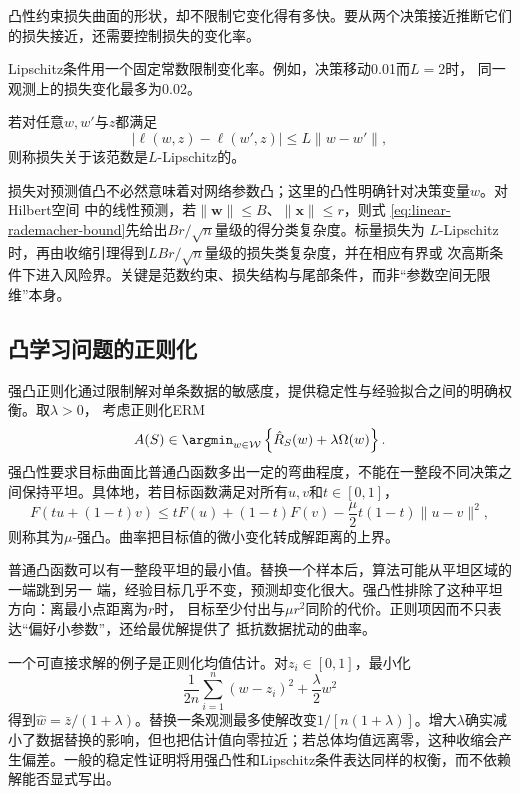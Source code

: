凸性约束损失曲面的形状，却不限制它变化得有多快。要从两个决策接近推断它们的损失接近，还需要控制损失的变化率。

Lipschitz条件用一个固定常数限制变化率。例如，决策移动0.01而$L=2$时，
同一观测上的损失变化最多为0.02。

\begin{definition}[Lipschitz损失]
\label{def:lipschitz-loss}
若对任意$w,w'$与$z$都满足
\begin{equation}
 |\ell(w,z)-\ell(w',z)|\leq L\|w-w'\|,
 \label{eq:lipschitz-loss}
\end{equation}
则称损失关于该范数是$L$-Lipschitz的。
\end{definition}

损失对预测值凸不必然意味着对网络参数凸；这里的凸性明确针对决策变量$w$。对Hilbert空间
中的线性预测，若$\|\bm w\|\leq B$、$\|\bm x\|\leq r$，则式
\eqref{eq:linear-rademacher-bound}先给出$Br/\sqrt n$量级的得分类复杂度。标量损失为
$L$-Lipschitz时，再由收缩引理得到$LBr/\sqrt n$量级的损失类复杂度，并在相应有界或
次高斯条件下进入风险界。关键是范数约束、损失结构与尾部条件，而非“参数空间无限维”本身。

\subsection{凸学习问题的正则化}

强凸正则化通过限制解对单条数据的敏感度，提供稳定性与经验拟合之间的明确权衡。取$\lambda>0$，
考虑正则化ERM
\begin{equation}
 A(S)\in\argmin_{w\in\mathcal W}
 \left\{\hat R_S(w)+\lambda\Omega(w)\right\}.
 \label{eq:regularized-erm}
\end{equation}
强凸性要求目标曲面比普通凸函数多出一定的弯曲程度，不能在一整段不同决策之间保持平坦。具体地，若目标函数满足对所有$u,v$和$t\in[0,1]$，
\begin{equation}
 F(tu+(1-t)v)\leq tF(u)+(1-t)F(v)
 -\frac\mu2t(1-t)\|u-v\|^2,
 \label{eq:strong-convexity}
\end{equation}
则称其为$\mu$-强凸。曲率把目标值的微小变化转成解距离的上界。

普通凸函数可以有一整段平坦的最小值。替换一个样本后，算法可能从平坦区域的一端跳到另一
端，经验目标几乎不变，预测却变化很大。强凸性排除了这种平坦方向：离最小点距离为$r$时，
目标至少付出与$\mu r^2$同阶的代价。正则项因而不只表达“偏好小参数”，还给最优解提供了
抵抗数据扰动的曲率。

一个可直接求解的例子是正则化均值估计。对$z_i\in[0,1]$，最小化
\[
 \frac1{2n}\sum_{i=1}^n(w-z_i)^2+\frac\lambda2w^2
\]
得到$\hat w=\bar z/(1+\lambda)$。替换一条观测最多使解改变$1/[n(1+\lambda)]$。增大$\lambda$确实减小了数据替换的影响，但也把估计值向零拉近；若总体均值远离零，这种收缩会产生偏差。一般的稳定性证明将用强凸性和Lipschitz条件表达同样的权衡，而不依赖解能否显式写出。

